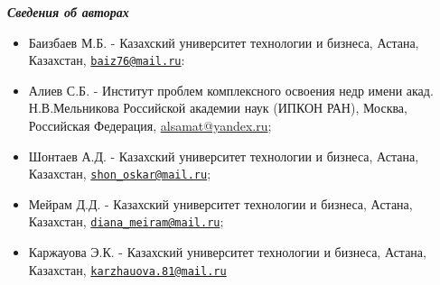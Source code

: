 \emph{{\bfseries Сведения об авторах}}

\begin{itemize}
\item
Баизбаев М.Б. - Казахский университет технологии и бизнеса, Астана,
Казахстан, \href{mailto:baiz76@mail.ru}{\nolinkurl{baiz76@mail.ru}}:

\item
Алиев С.Б. - Институт проблем комплексного освоения недр имени акад.
Н.В.Мельникова Российской академии наук (ИПКОН РАН), Москва, Российская
Федерация, \href{mailto:baiz76@mail.ru}{alsamat@yandex.ru};

\item
Шонтаев А.Д. - Казахский университет технологии и бизнеса, Астана,
Казахстан,
\href{mailto:shon_oskar@mail.ru}{\nolinkurl{shon\_oskar@mail.ru}};

\item
Мейрам Д.Д. - Казахский университет технологии и бизнеса, Астана,
Казахстан,
\href{mailto:diana_meiram@mail.ru}{\nolinkurl{diana\_meiram@mail.ru}};

\item
Каржауова Э.К. - Казахский университет технологии и бизнеса, Астана,
Казахстан,
\href{mailto:karzhauova.81@mail.ru}{\nolinkurl{karzhauova.81@mail.ru}}
\end{itemize}
